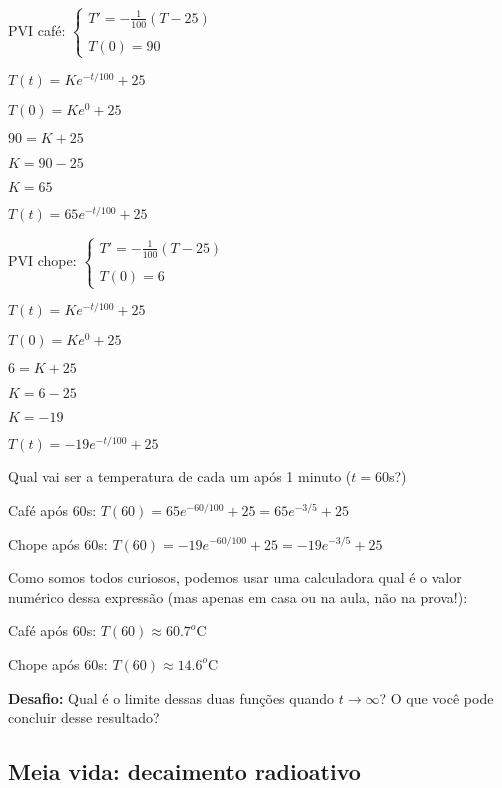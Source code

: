 \documentclass[a4paper]{article}
\begin{document}
\begin{multicols}{2}
PVI café:  $\left\{
    \begin{array}{l}
      T'=-\frac{1}{100}(T-25)\\
      \\
      T(0)=90
    \end{array}
  \right.$

$T(t)=Ke^{-t/100}+25$

$T(0)=Ke^{0}+25$

$90=K+25$

$K= 90 - 25$

$K=65$

$T(t)=65e^{-t/100}+25$

\columnbreak

PVI chope:  $\left\{
    \begin{array}{l}
      T'=-\frac{1}{100}(T-25)\\
      \\
      T(0)=6
    \end{array}
  \right.$

$T(t)=Ke^{-t/100}+25$

$T(0)=Ke^{0}+25$

$6=K+25$

$K= 6 - 25$

$K=-19$

$T(t)=-19e^{-t/100}+25$

\end{multicols}

Qual vai ser a temperatura de cada um após 1 minuto ($t=60$s?)

Café após $60$s: $T(60)=65e^{-60/100}+25 = 65e^{-3/5}+25$

Chope após $60$s: $T(60)=-19e^{-60/100}+25 = -19e^{-3/5}+25$

Como somos todos curiosos, podemos usar uma calculadora qual é o valor numérico dessa
expressão (mas apenas em casa ou na aula, não na prova!):

Café após $60$s: $T(60)\approx 60.7^o$C

Chope após $60$s: $T(60)\approx 14.6^o$C

\hrulefill

{\bf Desafio:} Qual é o limite dessas duas funções quando
$t\rightarrow \infty$? O que você pode concluir desse resultado?

\subsection{Meia vida: decaimento radioativo}
\end{document}
